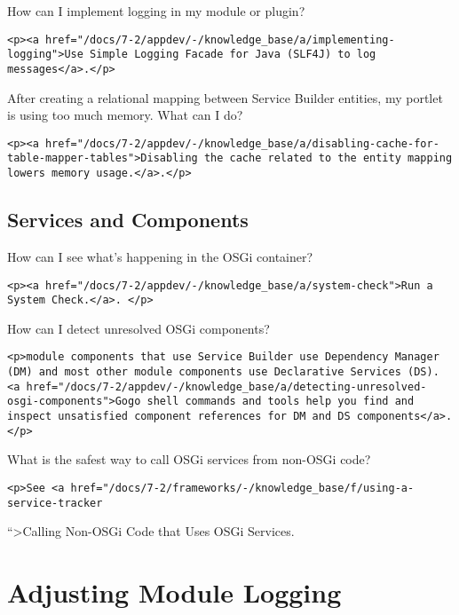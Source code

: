 {How can I implement logging in my module or plugin?~{}}

\begin{verbatim}
<p><a href="/docs/7-2/appdev/-/knowledge_base/a/implementing-logging">Use Simple Logging Facade for Java (SLF4J) to log messages</a>.</p>
\end{verbatim}

{After creating a relational mapping between Service Builder entities,
my portlet is using too much memory. What can I do?~{}}

\begin{verbatim}
<p><a href="/docs/7-2/appdev/-/knowledge_base/a/disabling-cache-for-table-mapper-tables">Disabling the cache related to the entity mapping lowers memory usage.</a>.</p>
\end{verbatim}

\section{Services and Components}\label{services-and-components}

{How can I see what's happening in the OSGi container?~{}}

\begin{verbatim}
<p><a href="/docs/7-2/appdev/-/knowledge_base/a/system-check">Run a System Check.</a>. </p>
\end{verbatim}

{How can I detect unresolved OSGi components?~{}}

\begin{verbatim}
<p>module components that use Service Builder use Dependency Manager (DM) and most other module components use Declarative Services (DS). <a href="/docs/7-2/appdev/-/knowledge_base/a/detecting-unresolved-osgi-components">Gogo shell commands and tools help you find and inspect unsatisfied component references for DM and DS components</a>. </p>
\end{verbatim}

{What is the safest way to call OSGi services from non-OSGi code?~{}}

\begin{verbatim}
<p>See <a href="/docs/7-2/frameworks/-/knowledge_base/f/using-a-service-tracker
\end{verbatim}

``\textgreater Calling Non-OSGi Code that Uses OSGi Services.

\chapter{Adjusting Module Logging}\label{adjusting-module-logging}

